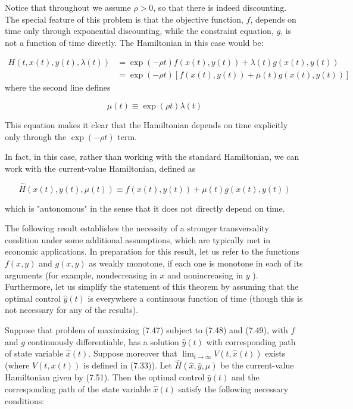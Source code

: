 \documentclass[\topdir/lecture_notes.tex]{subfiles}
\begin{document}
Notice that throughout we assume $\rho>0$, so that there is indeed discounting.\\
The special feature of this problem is that the objective function, $f$, depends on time only through exponential discounting, while the constraint equation, $g$, is not a function of time directly. The Hamiltonian in this case would be:

\[
\begin{aligned}
H(t, x(t), y(t), \lambda(t)) & =\exp (-\rho t) f(x(t), y(t))+\lambda(t) g(x(t), y(t)) \\
& =\exp (-\rho t)[f(x(t), y(t))+\mu(t) g(x(t), y(t))]
\end{aligned}
\]
where the second line defines

\[
\mu(t) \equiv \exp (\rho t) \lambda(t)
\]

This equation makes it clear that the Hamiltonian depends on time explicitly only through the $\exp (-\rho t)$ term.

In fact, in this case, rather than working with the standard Hamiltonian, we can work with the current-value Hamiltonian, defined as

\[
\hat{H}(x(t), y(t), \mu(t)) \equiv f(x(t), y(t))+\mu(t) g(x(t), y(t))
\]

which is "autonomous" in the sense that it does not directly depend on time.

The following result establishes the necessity of a stronger transversality condition under some additional assumptions, which are typically met in economic applications. In preparation for this result, let us refer to the functions $f(x, y)$ and $g(x, y)$ as weakly monotone, if each one is monotone in each of its arguments (for example, nondecreasing in $x$ and nonincreasing in $y$ ). Furthermore, let us simplify the statement of this theorem by assuming that the optimal control $\hat{y}(t)$ is everywhere a continuous function of time (though this is not necessary for any of the results).

\begin{theorem}
Suppose that problem of maximizing (7.47) subject to (7.48) and (7.49), with $f$ and $g$ continuously differentiable, has a solution $\hat{y}(t)$ with corresponding path of state variable $\hat{x}(t)$. Suppose moreover that $\lim _{t \rightarrow \infty} V(t, \hat{x}(t))$ exists (where $V(t, x(t))$ is defined in (7.33)). Let $\hat{H}(\hat{x}, \hat{y}, \mu)$ be the current-value Hamiltonian given by (7.51). Then the optimal control $\hat{y}(t)$ and the corresponding path of the state variable $\hat{x}(t)$ satisfy the following necessary conditions:
\end{theorem}
\end{document}
